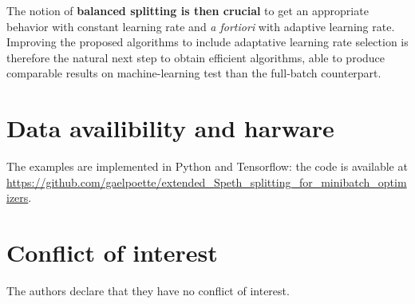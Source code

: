 \documentclass[article,authoryear,jmlmc]{beg_32}             %
\begin{document}
The notion of \textbf{balanced splitting is then crucial} to get an appropriate behavior with constant learning rate and {\em a fortiori} with adaptive learning rate. Improving the
proposed algorithms to include adaptative learning rate selection is therefore the natural next step to obtain efficient algorithms, able to produce comparable results on
machine-learning test than the full-batch counterpart. %



\section*{Data availibility and harware}
The examples are implemented in Python and Tensorflow: the code is available at \url{https://github.com/gaelpoette/extended_Speth_splitting_for_minibatch_optimizers}. 

\section*{Conflict of interest}
The authors declare that they have no conflict of interest.

\newpage


%



\clearpage

\appendix
\end{document}
